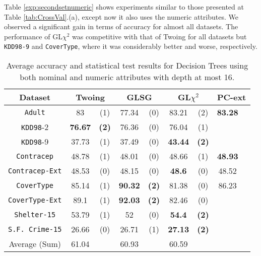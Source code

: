 Table \ref{exp:secondsetnumeric}
shows experiments  similar to those presented at Table \ref{tab:CrossVal}.(a), except now it also uses the numeric attributes.
We observed a significant gain in terms of accuracy for almost all datasets. 
The performance of GL$\chi^2$ was competitive with that of Twoing for all datasets but {\tt KDD98-9} and {\tt CoverType}, where it was
considerably better and worse, respectively.


\begin{table}
\small
\caption{Average accuracy and statistical test results for  Decision Trees using both nominal and numeric attributes with depth at most 16.}
\centering
\begin{tabular}{c|cc|cc|cc|cc} 
Dataset              &        \multicolumn{2}{c|}{Twoing} &   \multicolumn{2}{c|}{GLSG} &   \multicolumn{2}{c|}{GL$\chi^2$} & \multicolumn{2}{c}{PC-ext}  \\  \hline   
{\tt Adult}          &  83            &  (1)              &  77.34      &  (0)          &  83.21       &  (2)               & {\bf 83.28} &               \\
{\tt KDD98}-2        &  {\bf 76.67}   &  {\bf (2)}        &  76.36      &  (0)          &  76.04       &  (1)               &             &               \\
{\tt KDD98}-9        &  37.73         &  (1)              &  37.49      &  (0)          &  {\bf 43.44} &  {\bf (2)}         &             &               \\
{\tt Contracep}      &  48.78         &  (1)              &  48.01      &  (0)          &  48.66       &  (1)               & {\bf 48.93} &               \\
{\tt Contracep-Ext}  &  48.53         &  (0)              &  48.15      &  (0)          &  {\bf 48.6}  &  (0)               &  48.52      &               \\
{\tt CoverType}      &  85.14         &  (1)              &  {\bf 90.32}&  {\bf (2)}    &  81.38       &  (0)               &  86.23      &               \\
{\tt CoverType-Ext}  &  89.1          &  (1)              &  {\bf 92.03}&  {\bf (2)}    &  82.46       &  (0)               &             &               \\
{\tt Shelter-15}     &  53.79         &  (1)              &  52         &  (0)          &  {\bf 54.4}  &  {\bf (2)}         &             &               \\   
{\tt S.F. Crime-15}  &  26.66         &  (0)              &  26.71      &  (1)          &  {\bf 27.13} &  {\bf (2)}         &             &               \\
\hline
Average (Sum)        &   61.04        &                   & 60.93       &               &   60.59      &                    &             &


\end{tabular}
\end{table}
